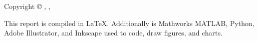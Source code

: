 \thispagestyle{empty}
{\small
\strut\vfill %
\noindent Copyright \copyright{} \projectGroup{}, \projectFaculty{} \projectSemester{}, \AAU{} \the\year\par
\vspace{0.2cm}
\noindent This report is compiled in \LaTeX. Additionally is Mathworks MATLAB, Python, Adobe Illustrator, and  Inkscape used to code, draw figures, and charts.
}
\clearpage
